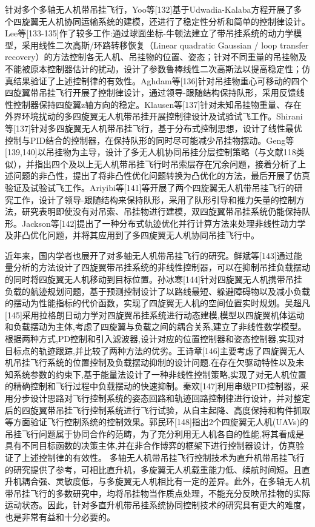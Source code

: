 针对多个多轴无人机带吊挂飞行，Yoo等[132]基于Udwadia-Kalaba方程开展了多个四旋翼无人机协同运输系统的建模，还进行了稳定性分析和简单的控制律设计。Lee等[133-135]作了较多工作:通过球面坐标-牛顿法建立了带吊挂系统的动力学模型，采用线性二次高斯/环路转移恢复（Linear quadratic Gaussian / loop transfer recovery）的方法控制各无人机、吊挂物的位置、姿态；针对不同重量的吊挂物及不能被原本控制器估计的扰动，设计了参数鲁棒线性二次高斯法以提高稳定性；仿真结果验证了上述控制律的有效性。Aghdam等[136]针对吊挂物重心可移动的四个四旋翼带吊挂飞行开展了控制律设计，通过领导-跟随结构保持队形，采用反馈线性控制器保持四旋翼z轴方向的稳定。Klausen等[137]针对未知吊挂物重量、存在外界环境扰动的多四旋翼无人机带吊挂开展控制律设计及试验试飞工作。Shirani等[137]针对多四旋翼无人机带吊挂飞行，基于分布式控制思想，设计了线性最优控制与PID结合的控制器，在保持队形的同时尽可能减少吊挂物摆动。Geng等[139,140]以吊挂物为主导，设计了多无人机协同吊挂分层控制策略（与文献118类似），并指出四个及以上无人机带吊挂飞行时吊索层存在冗余问题，接着分析了上述问题的非凸性，提出了将非凸性优化问题转换为凸优化的方法，最后开展了仿真验证及试验试飞工作。Ariyibi等[141]等开展了两个四旋翼无人机带吊挂飞行的研究工作，设计了领导-跟随结构来保持队形，采用了队形引导和推力矢量的控制方法，研究表明即使没有对吊索、吊挂物进行建模，双四旋翼带吊挂系统仍能保持队形。Jackson等[142]提出了一种分布式轨迹优化并行计算方法来处理非线性动力学及非凸优化问题，并将其应用到了多四旋翼无人机协同吊挂飞行中。

近年来，国内学者也展开了对多轴无人机带吊挂飞行的研究。鲜斌等[143]通过能量分析的方法设计了四旋翼带吊挂系统的非线性控制器，可以在抑制吊挂负载摆动的同时将四旋翼无人机移动到目标位置。孙冰寒[144]针对四旋翼无人机携带吊挂负载的航迹规划问题，基于预测控制设计了以路线最短、躲避障碍物以及减小负载的摆动为性能指标的代价函数，实现了四旋翼无人机的空间位置实时规划。吴超凡[145]采用拉格朗日动力学对四旋翼吊挂系统进行动态建模,模型以四旋翼机体运动和负载摆动为主体,考虑了四旋翼与负载之间的耦合关系,建立了非线性数学模型。根据两种方式,PD控制和引入滤波器,设计对应的位置控制器和姿态控制器,实现对目标点的轨迹跟踪,并比较了两种方法的优劣。王诗章[146]主要考虑了四旋翼无人机吊挂飞行系统的位置控制及负载摆动抑制的设计问题.在存在欠驱动特性以及未知系统参数的约束下,基于能量法设计了一种非线性控制策略,实现了对无人机位置的精确控制和飞行过程中负载摆动的快速抑制。秦欢[147]利用串级PID控制器，采用分步设计思路对飞行控制系统的姿态回路和轨迹回路控制律进行设计，并对整定后的四旋翼带吊挂飞行控制系统进行飞行试验，从自主起降、高度保持和构件抓取等方面验证飞行控制系统的控制效果。郭民环[148]指出2个四旋翼无人机(UAVs)的吊挂飞行问题属于协同合作的范畴，为了充分利用无人机各自的性能,将其看成是具有不同目标函数的决策主体,并在非合作博弈的框架下进行控制器设计，仿真验证了上述控制律的有效性。
多轴无人机带吊挂飞行控制技术为直升机带吊挂飞行的研究提供了参考，可相比直升机，多旋翼无人机载重能力低、续航时间短。且直升机耦合强、灵敏度低，与多旋翼无人机相比有一定的差异。此外，在多轴无人机带吊挂飞行的多数研究中，均将吊挂物当作质点处理，不能充分反映吊挂物的实际运动状态。因此，针对多直升机带吊挂系统协同控制技术的研究具有更大的难度，也是非常有益和十分必要的。

